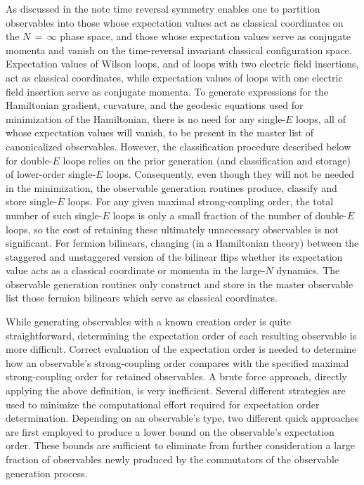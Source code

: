 \documentclass [12pt]{article}
\begin{document}
As discussed in the note \cite{latticesymm}
time reversal symmetry enables one to partition observables into
those whose expectation values act as classical coordinates on the
$N\,{=}\,\infty$ phase space,
and those whose expectation values serve as conjugate momenta and
vanish on the time-reversal invariant classical configuration space.
Expectation values of Wilson loops, and of loops with two electric
field insertions, act as classical coordinates, while
expectation values of loops with one electric field insertion
serve as conjugate momenta.
To generate expressions for the Hamiltonian gradient,
curvature, and the geodesic equations used for minimization
of the Hamiltonian, there is no need for any single-$E$ loops,
all of whose expectation values will vanish, to be present
in the master list of canonicalized observables.
However, the classification procedure described below for double-$E$
loops relies on the prior generation (and classification and storage)
of lower-order single-$E$ loops.
Consequently, even though they will not be needed in the
minimization, the observable generation routines
produce, classify and store single-$E$ loops.
For any given maximal strong-coupling order, the total
number of such single-$E$ loops is only a small fraction of the
number of double-$E$ loops, so the cost of retaining these
ultimately unnecessary observables is not significant.
For fermion bilinears, changing (in a Hamiltonian theory)
between the staggered and unstaggered version of the bilinear flips
whether its expectation value acts
as a classical coordinate or momenta
in the large-$N$ dynamics.
The observable generation routines only construct and store
in the master observable list those fermion bilinears which
serve as classical coordinates.

While generating observables with a known creation order
is quite straightforward,
determining the expectation order of each resulting observable
is more difficult.
Correct evaluation of the expectation order is
needed to determine how an observable's strong-coupling order
compares with the specified maximal
strong-coupling order for retained observables.
A brute force approach, directly applying the above definition,
is very inefficient.
Several different strategies are used to minimize the computational effort
required for expectation order determination.
Depending on an observable's type, two different quick
approaches are first employed to produce a lower bound on the observable's
expectation order.
These bounds are sufficient to eliminate from further consideration
a large fraction of observables newly produced by the commutators
of the observable generation process.
\end{document}
